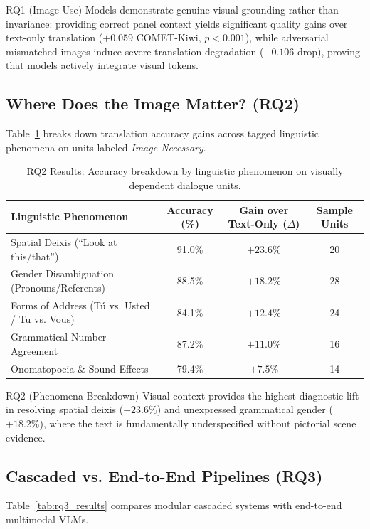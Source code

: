 \documentclass[11pt,a4paper]{article}
\begin{document}
\begin{keyfinding}{RQ1 (Image Use)}
Models demonstrate genuine visual grounding rather than invariance: providing correct panel context yields significant quality gains over text-only translation ($+0.059$ COMET-Kiwi, $p < 0.001$), while adversarial mismatched images induce severe translation degradation ($-0.106$ drop), proving that models actively integrate visual tokens.
\end{keyfinding}

\subsection{Where Does the Image Matter? (RQ2)}
Table~\ref{tab:rq2_results} breaks down translation accuracy gains across tagged linguistic phenomena on units labeled \textit{Image Necessary}.

\begin{table}[h!]
\centering
\small
\begin{tabular}{lccc}
\toprule
\textbf{Linguistic Phenomenon} & \textbf{Accuracy (\%)} & \textbf{Gain over Text-Only ($\Delta$)} & \textbf{Sample Units} \\
\midrule
Spatial Deixis (``Look at this/that'') & 91.0\% & $+23.6\%$ & 20 \\
Gender Disambiguation (Pronouns/Referents) & 88.5\% & $+18.2\%$ & 28 \\
Forms of Address (T\'u vs. Usted / Tu vs. Vous) & 84.1\% & $+12.4\%$ & 24 \\
Grammatical Number Agreement & 87.2\% & $+11.0\%$ & 16 \\
Onomatopoeia \& Sound Effects & 79.4\% & $+7.5\%$ & 14 \\
\bottomrule
\end{tabular}
\caption{RQ2 Results: Accuracy breakdown by linguistic phenomenon on visually dependent dialogue units.}
\label{tab:rq2_results}
\end{table}

\begin{keyfinding}{RQ2 (Phenomena Breakdown)}
Visual context provides the highest diagnostic lift in resolving spatial deixis ($+23.6\%$) and unexpressed grammatical gender ($+18.2\%$), where the text is fundamentally underspecified without pictorial scene evidence.
\end{keyfinding}

\subsection{Cascaded vs. End-to-End Pipelines (RQ3)}
Table~\ref{tab:rq3_results} compares modular cascaded systems with end-to-end multimodal VLMs.
\end{document}
